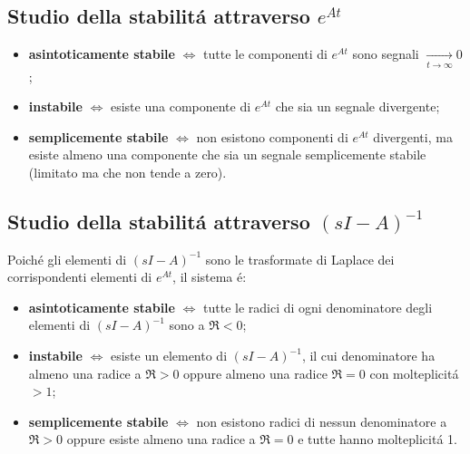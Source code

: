 \documentclass[../main.tex]{subfiles}
\begin{document}
	\subsection{Studio della stabilit\'a attraverso $ e^{At} $}       
		\begin{itemize}                                                           
			\item
				\textbf{asintoticamente stabile} $ \Leftrightarrow $ tutte le componenti di $ e^{At} $ sono segnali $ \xrightarrow[t \rightarrow \infty]{} 0 $;
			\item
				\textbf{instabile} $ \Leftrightarrow $ esiste una componente di $ e^{At} $ che sia un segnale divergente;
			\item
				\textbf{semplicemente stabile} $ \Leftrightarrow $ non esistono componenti di $ e^{At} $ divergenti, ma esiste almeno una componente che sia un segnale semplicemente stabile (limitato ma che non tende a zero).
		\end{itemize}
		
	\subsection{Studio della stabilit\'a attraverso $ (sI-A)^{-1} $}
		Poich\'e gli elementi di $ (sI-A)^{-1} $ sono le trasformate di Laplace dei corrispondenti elementi di $ e^{At} $, il sistema \'e:
		\begin{itemize}
			\item
				\textbf{asintoticamente stabile} $ \Leftrightarrow $ tutte le radici di ogni denominatore degli elementi di $ (sI-A)^{-1} $ sono a $ \Re < 0 $;
			\item
				\textbf{instabile} $ \Leftrightarrow $ esiste un elemento di $ (sI-A)^{-1} $, il cui denominatore ha almeno una radice a $ \Re > 0 $ oppure almeno una radice $ \Re = 0 $ con molteplicit\'a $ > 1 $;
			\item
				\textbf{semplicemente stabile} $ \Leftrightarrow $ non esistono radici di nessun denominatore a $ \Re > 0 $ oppure esiste almeno una radice a $ \Re = 0 $ e tutte hanno molteplicit\'a 1.
		\end{itemize}
	
\end{document}
